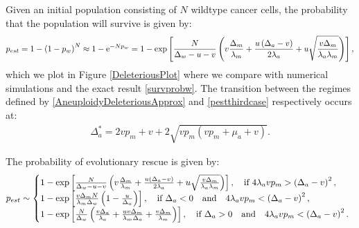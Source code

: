 \documentclass[12pt]{extarticle}
\newcommand{\e}{{\rm e}}
\begin{document}
Given an initial population consisting of $N$ wildtype cancer cells, the probability that the population will survive is given by: 
\begin{align}\label{pestthirdcase}
p_{est}=1-\left(1-p_w\right)^N\approx 1-\e^{-Np_w}=1-\exp\left[\frac{N}{\Delta_w-u-v}\left(v\frac{\Delta_m}{\lambda_m}+\frac{u\left(\Delta_a-v\right)}{2\lambda_a}+u\sqrt{\frac{v\Delta_m}{\lambda_a\lambda_m}}\right)\right],
\end{align}
which we plot in Figure \ref{DeleteriousPlot} where we compare with numerical simulations and the exact result \eqref{survprobw}. The transition between the regimes defined by \eqref{AneuploidyDeleteriousApprox} and \eqref{pestthirdcase} respectively occurs at:
\begin{align}\label{thresholdvalueaneuploid}
\Delta_a^*=2vp_m+v+2\sqrt{vp_m\left(vp_m+\mu_a+v\right)}.
\end{align}

The probability of evolutionary rescue is given by:
\begin{equation}
p_{est}\sim\left\{
  \begin{array}{@{}ll@{}}
  1-\exp\left[\frac{N}{\Delta_w-u-v}\left(v\frac{\Delta_m}{\lambda_m}+\frac{u\left(\Delta_a-v\right)}{2\lambda_a}+u\sqrt{\frac{v\Delta_m}{\lambda_a\lambda_m}}\right)\right],\quad\text{if }4\lambda_avp_m>\left(\Delta_a-v\right)^2,\\
   1-\exp\left[\frac{v\Delta_mN}{\lambda_m\Delta_w}\left(1-\frac{u}{\Delta_a}\right)\right],\quad\text{if }\Delta_a<0\quad\text{and}\quad4\lambda_avp_m<\left(\Delta_a-v\right)^2,\\
   1-\exp\left[\frac{N}{\Delta_w}\left(\frac{v\Delta_a}{\lambda_a}+\frac{uv\Delta_m}{\lambda_m\Delta_a}+\frac{v\Delta_m}{\lambda_m}\right)\right],\quad\text{if }\Delta_a>0\quad\text{and}\quad4\lambda_avp_m<\left(\Delta_a-v\right)^2.
  \end{array}\right.
\end{equation}

\end{document}

